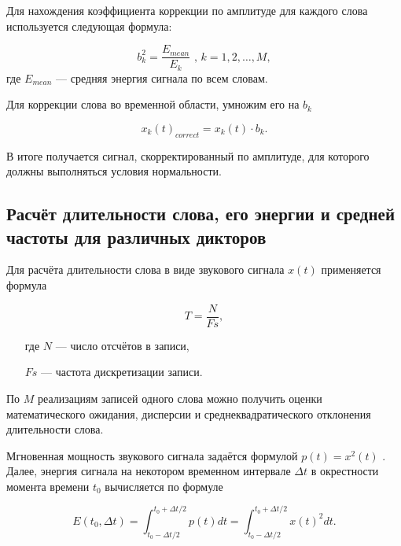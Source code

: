 Для нахождения коэффициента коррекции по амплитуде для каждого слова используется следующая формула:

\begin{equation} \label{eq:2_1_2_10}
b_k^2 = \frac{E_{mean}}{E_k}\text{ , }k = 1, 2, \dots, M,
\end{equation}
где $E_{mean}$ --- средняя энергия сигнала по всем словам.

Для коррекции слова во временной области, умножим его на $b_k$

\begin{equation} \label{eq:2_1_2_11}
x_k(t)_{correct} = x_k(t) \cdot b_k.
\end{equation}

В итоге получается сигнал, скорректированный по амплитуде, для которого должны выполняться условия нормальности.


\subsection{Расчёт длительности слова, его энергии и средней частоты для различных дикторов} \label{sect2_1_3}

Для расчёта длительности слова в виде звукового сигнала $x(t)$ применяется формула

\begin{equation}
T = \frac{N}{Fs},
\end{equation}
\begin{itemize}[align=left,leftmargin=1.8em,itemindent=0pt,labelsep=0pt,labelwidth=1.8em]
	\item[где] $N$ --- число отсчётов в записи,
	\item[] $Fs$ --- частота дискретизации записи.
\end{itemize}

По $M$ реализациям записей одного слова можно получить оценки математического ожидания, дисперсии и среднеквадратического отклонения длительности слова.

Мгновенная мощность звукового сигнала задаётся формулой $p(t) = x^2 (t)$ \cite{max1983methods}.
Далее, энергия сигнала на некотором временном интервале $\Delta t$ в окрестности момента времени $t_0$ вычисляется по формуле

\begin{equation}
E(t_0, \Delta t) =
\int_{t_0 - \Delta t/2}^{t_0 + \Delta t/2} p(t) dt =
\int_{t_0 - \Delta t/2}^{t_0 + \Delta t/2} x(t)^2 dt.
\end{equation}


